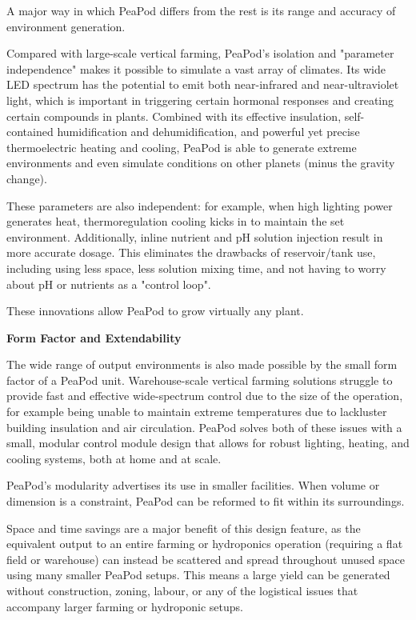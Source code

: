 \documentclass{report}
\begin{document}
A major way in which PeaPod differs from the rest is its range and accuracy of environment generation.

Compared with large-scale vertical farming, PeaPod’s isolation and "parameter independence" makes it possible to simulate a vast array of climates. Its wide LED spectrum has the potential to emit both near-infrared and near-ultraviolet light, which is important in triggering certain hormonal responses and creating certain compounds in plants. Combined with its effective insulation, self-contained humidification and dehumidification, and powerful yet precise thermoelectric heating and cooling, PeaPod is able to generate extreme environments and even simulate conditions on other planets (minus the gravity change). 

These parameters are also independent: for example, when high lighting power generates heat, thermoregulation cooling kicks in to maintain the set environment. Additionally, inline nutrient and pH solution injection result in more accurate dosage. This eliminates the drawbacks of reservoir/tank use, including using less space, less solution mixing time, and not having to worry about pH or nutrients as a "control loop".

These innovations allow PeaPod to grow virtually any plant. 

\textbf{Form Factor and Extendability}

The wide range of output environments is also made possible by the small form factor of a PeaPod unit. Warehouse-scale vertical farming solutions struggle to provide fast and effective wide-spectrum control due to the size of the operation, for example being unable to maintain extreme temperatures due to lackluster building insulation and air circulation. PeaPod solves both of these issues with a small, modular control module design that allows for robust lighting, heating, and cooling systems, both at home and at scale.

PeaPod’s modularity advertises its use in smaller facilities. When volume or dimension is a constraint, PeaPod can be reformed to fit within its surroundings.

Space and time savings are a major benefit of this design feature, as the equivalent output to an entire farming or hydroponics operation (requiring a flat field or warehouse) can instead be scattered and spread throughout unused space using many smaller PeaPod setups. This means a large yield can be generated without construction, zoning, labour, or any of the logistical issues that accompany larger farming or hydroponic setups.
\end{document}
